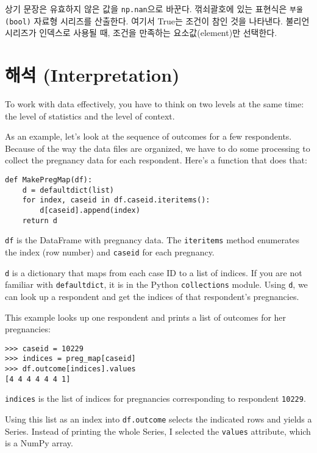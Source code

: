 상기 문장은 유효하지 않은 값을 {\tt np.nan}으로 바꾼다. 꺾쇠괄호에 있는 표현식은 {\tt 부울(bool)} 자료형 시리즈를 산출한다. 여기서 True는 조건이 참인 것을 나타낸다. 불리언 시리즈가 인덱스로 사용될 때, 조건을 만족하는 요소값(element)만 선택한다. 



\section{해석 (Interpretation)}


To work with data effectively, you have to think on two levels at the
same time: the level of statistics and the level of context.

As an example, let's look at the sequence of outcomes for a few
respondents.  Because of the way the data files are organized, we have
to do some processing to collect the pregnancy data for each respondent.
Here's a function that does that:

\begin{verbatim}
def MakePregMap(df):
    d = defaultdict(list)
    for index, caseid in df.caseid.iteritems():
        d[caseid].append(index)
    return d
\end{verbatim}

{\tt df} is the DataFrame with pregnancy data.  The {\tt iteritems}
method enumerates the index (row number)
and {\tt caseid} for each pregnancy.

{\tt d} is a dictionary that maps from each case ID to a list of
indices.  If you are not familiar with {\tt defaultdict}, it is in
the Python {\tt collections} module.
Using {\tt d}, we can look up a respondent and get the
indices of that respondent's pregnancies.

This example looks up one respondent and prints a list of outcomes
for her pregnancies:

\begin{verbatim}
>>> caseid = 10229
>>> indices = preg_map[caseid]
>>> df.outcome[indices].values
[4 4 4 4 4 4 1]
\end{verbatim}

{\tt indices} is the list of indices for pregnancies corresponding
to respondent {\tt 10229}.

Using this list as an index into {\tt df.outcome} selects the
indicated rows and yields a Series.  Instead of printing the
whole Series, I selected the {\tt values} attribute, which is
a NumPy array.  

